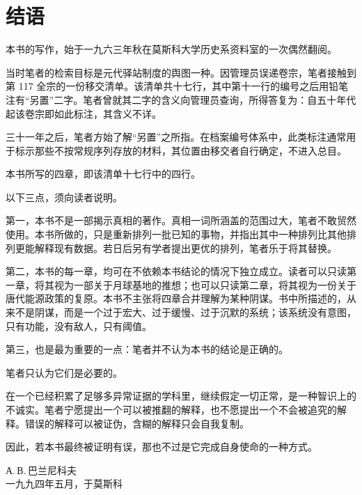 \clearpage
\chapter*{结\quad 语}

\enlargethispage{8\baselineskip}
本书的写作，始于一九六三年秋在莫斯科大学历史系资料室的一次偶然翻阅。

当时笔者的检索目标是元代驿站制度的舆图一种。因管理员误递卷宗，笔者接触到第 117 全宗的一份移交清单。该清单共十七行，其中第十一行的编号之后用铅笔注有“另置”二字。笔者曾就其二字的含义向管理员查询，所得答复为：自五十年代起该卷宗即如此标注，其含义不详。

三十一年之后，笔者方始了解“另置”之所指。在档案编号体系中，此类标注通常用于标示那些不按常规序列存放的材料，其位置由移交者自行确定，不进入总目。

本书所写的四章，即该清单十七行中的四行。

以下三点，须向读者说明。

第一，本书不是一部揭示真相的著作。真相一词所涵盖的范围过大，笔者不敢贸然使用。本书所做的，只是重新排列一批已知的事物，并指出其中一种排列比其他排列更能解释现有数据。若日后另有学者提出更优的排列，笔者乐于将其替换。

第二，本书的每一章，均可在不依赖本书结论的情况下独立成立。读者可以只读第一章，将其视为一部关于月球基地的推想；也可以只读第二章，将其视为一份关于唐代能源政策的复原。本书不主张将四章合并理解为某种阴谋。书中所描述的，从来不是阴谋，而是一个过于宏大、过于缓慢、过于沉默的系统；该系统没有意图，只有功能，没有敌人，只有阈值。

第三，也是最为重要的一点：笔者并不认为本书的结论是正确的。

笔者只认为它们是必要的。

在一个已经积累了足够多异常证据的学科里，继续假定一切正常，是一种智识上的不诚实。笔者宁愿提出一个可以被推翻的解释，也不愿提出一个不会被追究的解释。错误的解释可以被证伪，含糊的解释只会自我复制。

因此，若本书最终被证明有误，那也不过是它完成自身使命的一种方式。

\vspace{6mm}
\begin{flushright}
{\small А.\,В.\,巴兰尼科夫}\\[2pt]
{\footnotesize\color{pencil} 一九九四年五月，于莫斯科}
\end{flushright}

\clearpage
